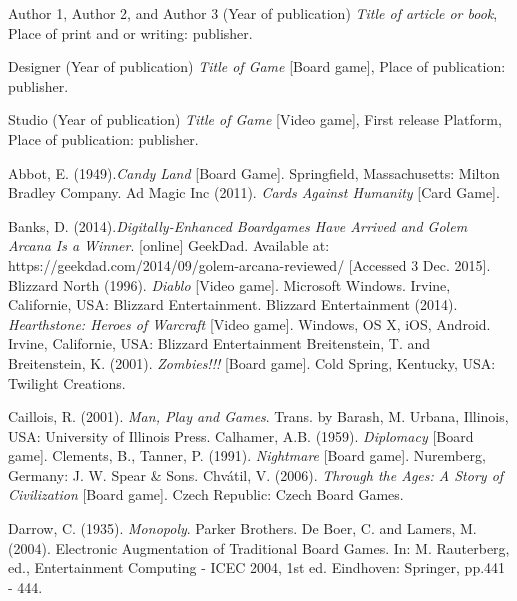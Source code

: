 \documentclass[a4paper,11pt]{article}
\begin{document}
\pagebreak
%
\begin{thebibliography}{1}

Author 1, Author 2, and Author 3 (Year of publication) \emph{Title of article or book}, Place of print and or writing: publisher.

Designer (Year of publication) \emph{Title of Game} [Board game], Place of publication: publisher.

Studio (Year of publication) \emph{Title of Game} [Video game],  First release Platform, Place of publication: publisher.

Abbot, E. (1949).\textit{Candy Land} [Board Game]. Springfield, Massachusetts: Milton Bradley Company.
Ad Magic Inc (2011). \textit{Cards Against Humanity} [Card Game].

Banks, D. (2014).\textit{Digitally-Enhanced Boardgames Have Arrived and Golem Arcana Is a Winner}. [online] GeekDad. Available at: https://geekdad.com/2014/09/golem-arcana-reviewed/ [Accessed 3 Dec. 2015].
Blizzard North (1996). \textit{Diablo} [Video game]. Microsoft Windows. Irvine, Californie, USA: Blizzard Entertainment.
Blizzard Entertainment (2014). \textit{Hearthstone: Heroes of Warcraft} [Video game]. Windows, OS X, iOS, Android.  Irvine, Californie, USA: Blizzard Entertainment
Breitenstein, T. and Breitenstein, K. (2001). \textit{Zombies!!!} [Board game]. Cold Spring, Kentucky, USA: Twilight Creations.

Caillois, R. (2001). \textit{Man, Play and Games}. Trans. by Barash, M. Urbana, Illinois, USA: University of Illinois Press.
Calhamer, A.B. (1959). \textit{Diplomacy} [Board game].
Clements, B., Tanner, P. (1991). \textit{Nightmare} [Board game]. Nuremberg, Germany: J. W. Spear \& Sons.
Chvátil, V. (2006). \textit{Through the Ages: A Story of Civilization} [Board game]. Czech Republic: Czech Board Games.

Darrow, C. (1935). \textit{Monopoly}. Parker Brothers.
De Boer, C. and Lamers, M. (2004). Electronic Augmentation of Traditional Board Games. In: M. Rauterberg, ed., Entertainment Computing - ICEC 2004, 1st ed. Eindhoven: Springer, pp.441 - 444.


\end{thebibliography}
\end{document}
